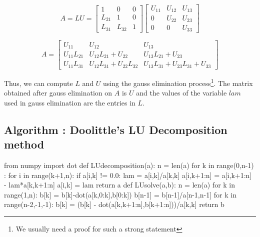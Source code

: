	\[ A = LU = \begin{bmatrix} 1 & 0 & 0 \\ L_{21} & 1 & 0 \\ L_{31} & L_{32} & 1 \end{bmatrix} \begin{bmatrix} U_{11} & U_{12} & U_{13} \\ 0 & U_{22} & U_{23} \\ 0 & 0 & U_{33} \end{bmatrix} \]

	\[ A= \begin{bmatrix} U_{11} & U_{12} & U_{13} \\ U_{11}L_{21} & U_{12}L_{21} + U_{22} & U_{13}L_{21}+U_{23} \\ U_{11}L_{31} & U_{12}L_{31}+U_{22}L_{32} & U_{13}L_{31} + U_{23}L_{31} + U_{33} \end{bmatrix} \]

	Thus, we can compute $L$ and $U$ using the gauss elimination process\footnote{We usually need a proof for such a strong statement}. The matrix obtained after gauss elimination on $A$ is $U$ and the values of the variable $lam$ used in gauss elimination are the entries in $L$.


\subsection{Algorithm : Doolittle's LU Decomposition method}
\begin{program}
	\begin{python}
		from numpy import dot
		def LUdecomposition(a):
			n = len(a)
			for k in range(0,n-1) : 
				for i in range(k+1,n):
					if a[i,k] != 0.0:
						lam = a[i,k]/a[k,k]
						a[i,k+1:n] = a[i,k+1:n] - lam*a[k,k+1:n]
						a[i,k] = lam
			return a
		def LUsolve(a,b):
			n = len(a)
			for k in range(1,n):
				b[k] = b[k]-dot(a[k,0:k],b[0:k])
			b[n-1] = b[n-1]/a[n-1,n-1]
			for k in range(n-2,-1,-1):
				b[k] = (b[k] - dot(a[k,k+1:n],b[k+1:n]))/a[k,k]
			return b
	\end{python}
\end{program}

